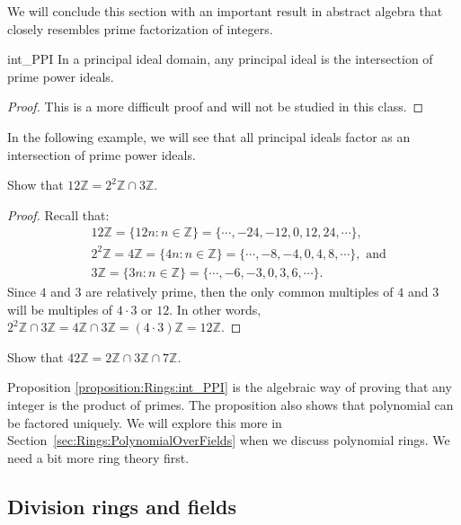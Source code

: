 We will conclude this section with an important result in abstract algebra that closely resembles prime factorization of integers.

\begin{prop}{int_PPI}
In a principal ideal domain, any principal ideal is the intersection of prime power ideals.\\
\end{prop}

\begin{proof}
This is a more difficult proof and will not be studied in this class.
\end{proof}

In the following example, we will see that all principal ideals factor as an intersection of prime power ideals.

\begin{example}{}
Show that $12{\mathbb Z}=2^2{\mathbb Z}\cap 3{\mathbb Z}$.
\end{example}

\begin{proof}
Recall that:
\begin{align*}
&12{\mathbb Z}=\{12n:n\in{\mathbb Z}\}=\{\cdots,-24,-12,0,12,24,\cdots\},\\
&2^2{\mathbb Z}=4{\mathbb Z}=\{4n:n\in{\mathbb Z}\}=\{\cdots,-8,-4,0,4,8,\cdots\}, \text{ and}\\ &3{\mathbb Z}=\{3n:n\in{\mathbb Z}\}=\{\cdots,-6,-3,0,3,6,\cdots\}.  
\end{align*}
Since $4$ and $3$ are relatively prime, then the only common multiples of $4$ and $3$ will be multiples of $4\cdot 3$ or $12$.  In other words, $2^2{\mathbb Z}\cap 3{\mathbb Z}=4{\mathbb Z}\cap 3{\mathbb Z}=(4\cdot 3){\mathbb Z}=12{\mathbb Z}$.
\end{proof}

\begin{exercise}{}
Show that $42{\mathbb Z}=2{\mathbb Z}\cap 3{\mathbb Z}\cap 7{\mathbb Z}$.
\end{exercise}

Proposition \ref{proposition:Rings:int_PPI} is the algebraic way of proving that any integer is the product of primes. The proposition also shows that polynomial can be factored uniquely.  We will explore this more in Section~\ref{sec:Rings:PolynomialOverFields} when we discuss polynomial rings.  We need a bit more ring theory first.

\subsection{Division rings and fields\quad
{}}
\label{subsec:Rings:IntegralDomainsPrincipalIdealDomains:DivisionRingAndField}

